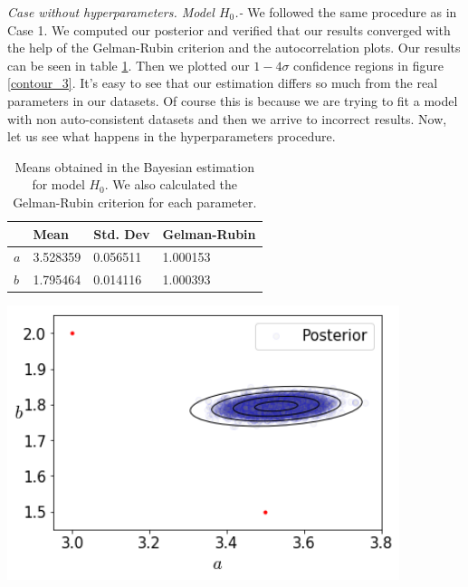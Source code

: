 \documentclass[onecolumn,           %
               showpacs,            %
               preprintnumbers,     %
               aps,                 %
               prl,          	    %
               letterpaper,             %
               superscriptaddress,      %
               nofootinbib,         %
               tightenlines,        %
               floats,floatfix      %
               ,usenatbib,
               ]{revtex4-1}
\begin{document}
\textit{Case without hyperparameters. Model $H_0$.-} We followed the same procedure as in Case 1. We computed our posterior and verified that our results converged with the help of the Gelman-Rubin criterion and the autocorrelation plots. Our results can be seen in table \ref{tab2}. Then we plotted our $1-4 \sigma$ confidence regions in figure \ref{contour_3}. It's easy to see that our estimation differs so much from the real parameters in our datasets. Of course this is because we are trying to fit a model with non auto-consistent datasets and then we arrive to incorrect results. Now, let us see what happens in the hyperparameters procedure.    

\begin{table}[h!]
\centering
\begin{tabular}{||l|l|l|l||} 
 \hline
 & \textbf{Mean} & \textbf{Std. Dev} & \textbf{Gelman-Rubin} \\ [0.5ex] 
 \hline\hline
$a$ & 3.528359 	 & 0.056511 & 1.000153 \\
\hline
$b$ & 1.795464 & 0.014116 	 	 & 1.000393\\ [1ex] 
 \hline
\end{tabular}
\caption{\footnotesize{Means obtained in the Bayesian estimation for model $H_0$. We also calculated the Gelman-Rubin criterion for each parameter.}}
\label{tab2}
\end{table}

\begin{minipage}{\textwidth}
\centering
\includegraphics[height=8cm]{Figures/contour_3.png}
\label{contour_3}
\end{minipage}\\ $ $
\end{document}
